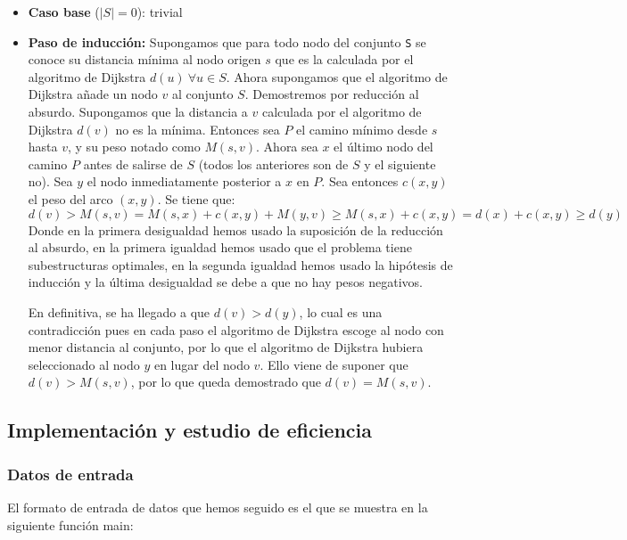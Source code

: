 \documentclass{article}
\begin{document}
\begin{itemize}
    \item \textbf{Caso base} ($|S|=0$): trivial
    \item \textbf{Paso de inducción:} Supongamos que para todo nodo del conjunto \verb|S| se conoce su distancia mínima al nodo origen $s$ que es la calculada por el algoritmo de Dijkstra $d(u)\ \forall u \in S$. Ahora supongamos que el algoritmo de Dijkstra añade un nodo $v$ al conjunto $S$. Demostremos por reducción al absurdo. Supongamos que la distancia a $v$ calculada por el algoritmo de Dijkstra $d(v)$ no es la mínima. Entonces sea $P$ el camino mínimo desde $s$ hasta $v$, y su peso notado como $M(s,v)$. Ahora sea $x$ el último nodo del camino $P$ antes de salirse de $S$ (todos los anteriores son de $S$ y el siguiente no). Sea $y$ el nodo inmediatamente posterior a $x$ en $P$. Sea entonces $c(x,y)$ el peso del arco $(x,y)$. Se tiene que:
\[
    d(v) > M(s,v) = M(s,x) + c(x,y) + M(y,v) \geq M(s,x) + c(x,y) = d(x) + c(x,y) \geq d(y)    
\]
    Donde en la primera desigualdad hemos usado la suposición de la reducción al absurdo, en la primera igualdad hemos usado que el problema tiene subestructuras optimales, en la segunda igualdad hemos usado la hipótesis de inducción y la última desigualdad se debe a que no hay pesos negativos.

    En definitiva, se ha llegado a que $d(v) > d(y)$, lo cual es una contradicción pues en cada paso el algoritmo de Dijkstra escoge al nodo con menor distancia al conjunto, por lo que el algoritmo de Dijkstra hubiera seleccionado al nodo $y$ en lugar del nodo $v$. Ello viene de suponer que $d(v) > M(s,v)$, por lo que queda demostrado que $d(v) = M(s,v)$.

\end{itemize}

\subsection{Implementación y estudio de eficiencia}
\subsubsection{Datos de entrada}
El formato de entrada de datos que hemos seguido es el que se muestra en la siguiente función main: 

\end{document}
